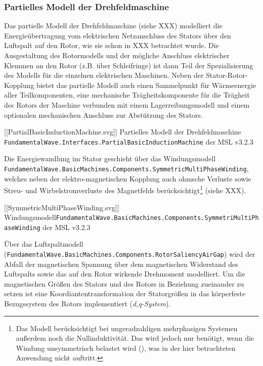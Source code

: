 \hypertarget{partielles-modell-der-drehfeldmaschine}{%
\subsubsection{Partielles Modell der
Drehfeldmaschine}\label{partielles-modell-der-drehfeldmaschine}}

Das partielle Modell der Drehfeldmaschine (siehe XXX) modelliert die
Energieübertragung vom elektrischen Netzanschluss des Stators über den
Luftspalt auf den Rotor, wie sie schon in XXX betrachtet wurde. Die
Ausgestaltung des Rotormodells und der mögliche Anschluss elektrischer
Klemmen an den Rotor (z.B. über Schleifringe) ist dann Teil der
Spezialisierung des Modells für die einzelnen elektrischen Maschinen.
Neben der Stator-Rotor-Kopplung bietet das partielle Modell auch einen
Sammelpunkt für Wärmeenergie aller Teilkomponenten, eine mechanische
Trägheitskomponente für die Trägheit des Rotors der Maschine verbunden
mit einem Lagerreibungsmodell und einem optionalen mechanischen
Anschluss zur Abstützung des Stators.

{[}{[}PartialBasicInductionMachine.svg{]}{]} Partielles Modell der
Drehfeldmaschine
\texttt{FundamentalWave.Interfaces.PartialBasicInductionMachine} der MSL
v3.2.3

Die Energiewandlung im Stator geschieht über das Windungsmodell
\texttt{FundamentalWave.BasicMachines.Components.SymmetricMultiPhaseWinding},
welches neben der elektro-magnetischen Kopplung auch ohmsche Verluste
sowie Streu- und Wirbelstromverluste des Magnetfelds
berücksichtigt\footnote{Das Modell berücksichtigt bei ungeradzahligen
  mehrphasigen Systemen außerdem noch die Nullinduktivität. Das wird
  jedoch nur benötigt, wenn die Windung unsymmetrisch belastet wird
  (\cite[S. 193]{kralModelicaObjektorientierteModellbildung2019}), was
  in der hier betrachteten Anwendung nicht auftritt.} (siehe XXX).

{[}{[}SymmetricMultiPhaseWinding.svg{]}{]}
Windungsmodell\texttt{FundamentalWave.BasicMachines.Components.SymmetriMultiPhaseWinding}
der MSL v3.2.3

Über das Luftspaltmodell
(\texttt{FundamentalWave.BasicMachines.Components.RotorSaliencyAirGap})
wird der Abfall der magnetischen Spannung über dem magnetischen
Widerstand des Luftspalts sowie das auf den Rotor wirkende Drehmoment
modelliert. Um die magnetischen Größen des Stators und des Rotors in
Beziehung zueinander zu setzen ist eine Koordiantentransformation der
Statorgrößen in das körperfeste Bezugssystem des Rotors implementiert
(\emph{d,q-System}).

